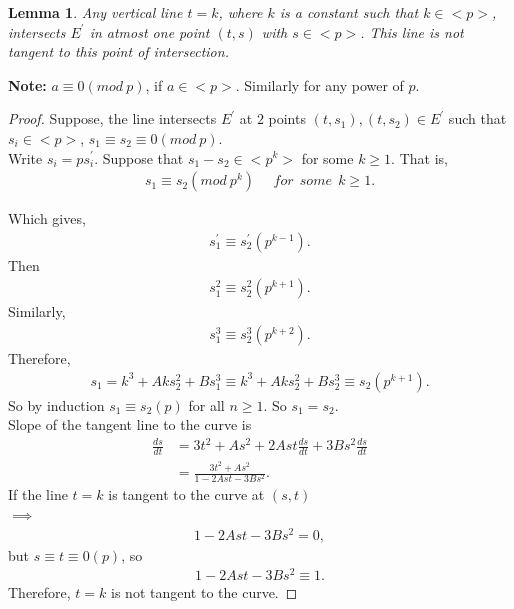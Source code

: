 \documentclass[12pt,leqno]{amsart}
\newcommand{\<}{\langle}
\renewcommand{\>}{\rangle}
\newtheorem{lemma}{Lemma}
\theoremstyle{definition}
\numberwithin{equation}{section}
\begin{document}
\begin{lemma}\label{lemma10}
    Any vertical line $t=k$, where $k$ is a constant such that $k\in <p>$, intersects $E^'$ in atmost one point $(t,s)$ with $s\in <p>$. This line is not tangent to this point of intersection. 
\end{lemma}
\textbf{Note:} $a\equiv 0(mod~ p)$, if $a\in <p>$. Similarly for any power of $p$.
\begin{proof}
Suppose, the line intersects $E^'$ at $2$ points $(t,s_1),(t,s_2)\in E^'$ such that $s_i\in <p>$, $s_1\equiv s_2\equiv 0(mod~p)$.\\
Write $s_i=ps_i^'$.
Suppose that $s_1-s_2\in <p^k>$ for some $k\geq 1$. That is,
\begin{align*}
    s_1\equiv s_2(mod~p^k)~~~~~~for~~some~~ k\geq 1.
\end{align*}

Which gives,
    \begin{align*}
        s_1^{'}\equiv s_2^{'}(p^{k-1}).
    \end{align*}
    Then\\
    \smallskip
    \begin{align*}
        s_1^2\equiv s_2^2(p^{k+1}).
    \end{align*}
    Similarly,
    \begin{align*}
         s_1^3\equiv s_2^3(p^{k+2}).
    \end{align*}
    Therefore,
    \begin{align*}
        s_1=k^3+Aks_2^2+Bs_1^3\equiv k^3+Aks_2^2+Bs_2^3\equiv s_2(p^{k+1}).
    \end{align*}
    So by induction $s_1\equiv s_2(p)$ for all $n\geq 1.$ So $s_1=s_2$.\\
    Slope of the tangent line to the curve is 
    \begin{align*}
        \frac{ds}{dt}&=3t^2+As^2+2Ast\frac{ds}{dt}+3Bs^2\frac{ds}{dt}\\
        &=\frac{3t^2+As^2}{1-2Ast-3Bs^2}.
    \end{align*}
    If the line $t=k$ is tangent to the curve at $(s,t)$\\
    $\implies$\begin{align*}
        1-2Ast-3Bs^2=0,
    \end{align*} 
    but $s\equiv t\equiv 0(p)$, so
    \begin{align*}
        1-2Ast-3Bs^2\equiv 1. %
    \end{align*}
    Therefore, $t=k$ is not tangent to the curve.
    
\end{proof}
\end{document}
